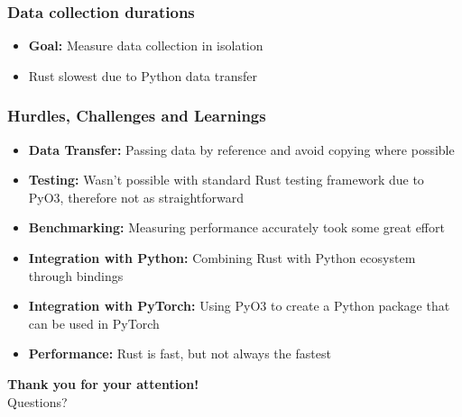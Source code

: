 \documentclass[t,english]{beamer}
\begin{document}
\begin{frame}
  \frametitle{Data collection durations}
  \begin{itemize}
    \item \textbf{Goal:} Measure data collection in isolation
  \end{itemize}
  \begin{itemize}
    \item<3->  Rust slowest due to Python data transfer
  \end{itemize}
\end{frame}

\begin{frame}
  \frametitle{Hurdles, Challenges and Learnings}
  \begin{itemize}
    \item<1-> \textbf{Data Transfer:} Passing data by reference and avoid copying where possible
    \item<2-> \textbf{Testing:} Wasn't possible with standard Rust testing framework due to PyO3, therefore not as straightforward
    \item<3-> \textbf{Benchmarking:} Measuring performance accurately took some great effort
    \item<4-> \textbf{Integration with Python:} Combining Rust with Python ecosystem through bindings
    \item<5-> \textbf{Integration with PyTorch:} Using PyO3 to create a Python package that can be used in PyTorch
    \item<6-> \textbf{Performance:} Rust is fast, but not always the fastest
  \end{itemize}
\end{frame}

\begin{frame}
  \centering
  \Huge
  \textbf{Thank you for your attention!}
  \vspace{1cm}
  \\
  \Large
  Questions?
\end{frame}
\end{document}
